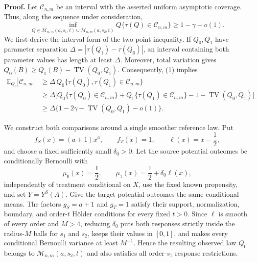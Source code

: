 \textbf{Proof.}
Let \(\mathcal C_{n,m}\) be an interval with the asserted uniform asymptotic coverage.  Thus, along the sequence under consideration,
\[
 \inf_{Q\in\mathcal M_{n,m}(a,s_1,t)\cup
                   \mathcal M_{n,m}(a,s_2,t)}
 Q\{\tau(Q)\in\mathcal C_{n,m}\}
 \ge1-\gamma-o(1).
\tag{1}
\]
We first derive the interval form of the two-point inequality.  If \(Q_0,Q_1\) have parameter separation
\(\Delta=|\tau(Q_1)-\tau(Q_0)|\), an interval containing both parameter values has length at least \(\Delta\).  Moreover, total variation gives
\(Q_0(B)\ge Q_1(B)-\operatorname{TV}(Q_0,Q_1)\).  Consequently, (1) implies
\[
\begin{aligned}
 \mathbb E_{Q_0}|\mathcal C_{n,m}|
 &\ge \Delta\,Q_0\{\tau(Q_0),\tau(Q_1)\in\mathcal C_{n,m}\}\\
 &\ge \Delta\bigl[
 Q_0\{\tau(Q_0)\in\mathcal C_{n,m}\}
 +Q_1\{\tau(Q_1)\in\mathcal C_{n,m}\}
 -1-\operatorname{TV}(Q_0,Q_1)
 \bigr]\\
 &\ge \Delta\{1-2\gamma-\operatorname{TV}(Q_0,Q_1)-o(1)\}.
\end{aligned}
\tag{2}
\]

We construct both comparisons around a single smoother reference law.  Put
\[
 f_S(x)=(a+1)x^a,
 \qquad f_T(x)=1,
 \qquad \ell(x)=x-\frac12,
\tag{3}
\]
and choose a fixed sufficiently small \(\delta_0>0\).  Let the source potential outcomes be conditionally Bernoulli with
\[
 \mu_0(x)=\frac12,
 \qquad
 \mu_1(x)=\frac12+\delta_0\ell(x),
\tag{4}
\]
independently of treatment conditional on \(X\), use the fixed known propensity, and set \(Y=Y^S(A)\).  Give the target potential outcomes the same conditional means.  The factors \(g_S=a+1\) and \(g_T=1\) satisfy their support, normalization, boundary, and order-\(t\) H\"older conditions for every fixed \(t>0\).  Since \(\ell\) is smooth of every order and \(M>4\), reducing \(\delta_0\) puts both responses strictly inside the radius-\(M\) balls for \(s_1\) and \(s_2\), keeps their values in \([0,1]\), and makes every conditional Bernoulli variance at least \(M^{-1}\).  Hence the resulting observed law \(Q_0\) belongs to \(\mathcal M_{n,m}(a,s_2,t)\) and also satisfies all order-\(s_1\) response restrictions.

